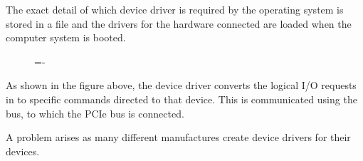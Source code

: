 \documentclass[a4paper]{systems-software}
\begin{document}
The exact detail of which device driver is required by the operating system is stored in a file and the drivers for the hardware connected are loaded when the computer system is booted.

\begin{figure}[H]
  \lineskip=-\fboxrule
\end{figure}

As shown in the figure above, the device driver converts the logical I/O requests in to specific commands directed to that device. This is communicated using the bus, to which the PCIe bus is connected.

A problem arises as many different manufactures create device drivers for their devices.
\end{document}
